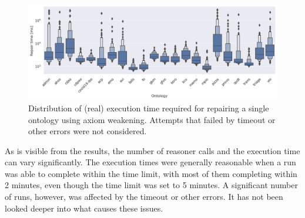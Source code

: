 \begin{figure}[H]
  \centering
  \includegraphics[width=\textwidth]{resources/time-ontology-violin.png}
  \caption{Distribution of (real) execution time required for repairing a single ontology using axiom weakening. Attempts that failed by timeout or other errors were not considered.}
  \label{fig:results-perf-time}
\end{figure}

As is visible from the results, the number of reasoner calls and the execution time can vary significantly. The execution times were generally reasonable when a run was able to complete within the time limit, with most of them completing within 2 minutes, even though the time limit was set to 5 minutes. A significant number of runs, however, was affected by the timeout or other errors. It has not been looked deeper into what causes these issues.


